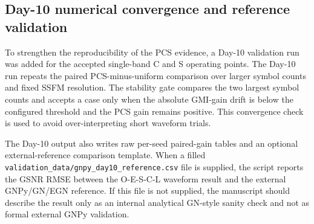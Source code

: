 \subsection{Day-10 numerical convergence and reference validation}
To strengthen the reproducibility of the PCS evidence, a Day-10 validation run was added for the accepted single-band C and S operating points. The Day-10 run repeats the paired PCS-minus-uniform comparison over larger symbol counts and fixed SSFM resolution. The stability gate compares the two largest symbol counts and accepts a case only when the absolute GMI-gain drift is below the configured threshold and the PCS gain remains positive. This convergence check is used to avoid over-interpreting short waveform trials.

The Day-10 output also writes raw per-seed paired-gain tables and an optional external-reference comparison template. When a filled \texttt{validation\_data/gnpy\_day10\_reference.csv} file is supplied, the script reports the GSNR RMSE between the O-E-S-C-L waveform result and the external GNPy/GN/EGN reference. If this file is not supplied, the manuscript should describe the result only as an internal analytical GN-style sanity check and not as formal external GNPy validation.
